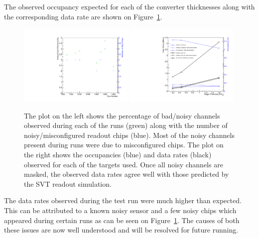 The observed occupancy expected for each of the converter thicknesses along with the 
corresponding data rate are shown on Figure~\ref{fig:data_rates}.
\begin{figure}[h]
    \begin{center}
    	\includegraphics[width=0.49\textwidth]{test2012/svtperformance/daq/n_dead_channels.pdf}
    	\includegraphics[width=0.49\textwidth]{test2012/svtperformance/daq/data_rates.pdf}
        \caption{
                    The plot on the left shows the percentage of bad/noisy channels observed
                    during each of the runs (green) along with the number of noisy/misconfigured 
                    readout chips (blue).  Most of the noisy channels present during runs were
                    due to misconfigured chips.  The  plot on the right shows the occupancies (blue)
                    and data rates (black) observed for each of the targets used.  Once all noisy channels
                    are masked, the observed data rates agree well with those predicted by the
                    SVT readout simulation. 
                } 
	\label{fig:data_rates}
    \end{center}
\end{figure}
The data rates observed during the test run were
much higher than expected.  This can be attributed to a known
noisy sensor and a few noisy chips which appeared during certain runs as can be seen
on Figure~\ref{fig:data_rates}.  The causes
of both these issues are now well understood and will be resolved for future running.

